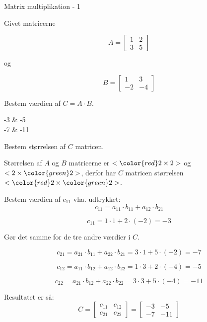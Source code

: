 \documentclass{article}
\begin{document}
\tableofcontents
\newpage

\begin{exercise}{Matrix multiplikation - 1}

Givet matricerne

\[
A = \left[\begin{array}{rr}
1 & 2 \\
3 & 5
\end{array} \right]
\]

og

\[
B = \left[\begin{array}{rr}
1 & 3 \\
-2 & -4
\end{array} \right]
\]

Bestem værdien af $C = A \cdot B$.

\begin{answermatrix}
-3 & -5 \\
-7 & -11
\end{answermatrix}

\hint
Bestem størrelsen af $C$ matricen.

\hint
Størrelsen af $A$ og $B$ matricerne er $<{\color{red} 2} \times 2>$ og $<2 \times {\color{green}2}>$,
derfor har $C$ matricen størrelsen $<{\color{red} 2} \times {\color{green}2}>$.

\hint
Bestem værdien af $c_{11}$ vha. udtrykket:
\[
c_{11} = a_{11} \cdot b_{11} + a_{12} \cdot b_{21}
\]

\hint
\[
c_{11} = 1 \cdot 1 + 2 \cdot (-2) = -3
\]

\hint
Gør det samme for de tre andre værdier i $C$.

\hint
\[
c_{21} = a_{21} \cdot b_{11} + a_{22} \cdot b_{21} = 3 \cdot 1 + 5 \cdot (-2) = -7
\]

\hint
\[
c_{12} = a_{11} \cdot b_{12} + a_{12} \cdot b_{22} = 1 \cdot 3 + 2 \cdot (-4) = -5
\]

\hint
\[
c_{22} = a_{21} \cdot b_{12} + a_{22} \cdot b_{22} = 3 \cdot 3 + 5 \cdot (-4) = -11
\]


\hint
Resultatet er så:
\[
C = \left[\begin{array}{rr}
c_{11} & c_{12} \\
c_{21} & c_{22}
\end{array} \right] =
\left[\begin{array}{rr}
-3 & -5 \\
-7 & -11
\end{array} \right]
\]


\end{exercise}
\end{document}
